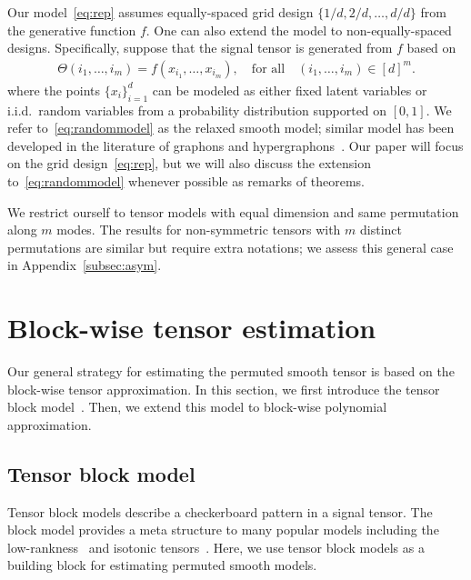 \documentclass[12pt]{article}
\theoremstyle{definition}
\begin{document}
{\color{blue}Our model~\eqref{eq:rep} assumes equally-spaced grid design $\{1/d,2/d,\ldots,d/d\}$ from the generative function $f$. One can also extend the model to non-equally-spaced designs. Specifically, suppose that the signal tensor is generated from $f$ based on 
\begin{align}\label{eq:randommodel}
\Theta(i_1,\ldots,i_m) = f(x_{i_1},\ldots,x_{i_m}), \quad \text{for all} \quad (i_1,\ldots,i_m)\in[d]^m. 
\end{align}
where the points $\{x_i\}_{i=1}^d$ can be modeled as either fixed latent variables or i.i.d.\ random variables from a probability distribution supported on $[0,1]$. We refer to~\eqref{eq:randommodel} as the relaxed smooth model; similar model has been developed in the literature of graphons and hypergraphons~\cite{chan2014consistent,gao2015rate,klopp2017oracle,balasubramanian2021nonparametric}. Our paper will focus on the grid design~\eqref{eq:rep}, but we will also discuss the extension to~\eqref{eq:randommodel} whenever possible as remarks of theorems.}      

We restrict ourself to tensor models with equal dimension and same permutation along $m$ modes. The results for non-symmetric tensors with $m$ distinct permutations are similar but require extra notations; we assess this general case in Appendix~\ref{subsec:asym}. 
    

\section{Block-wise tensor estimation}\label{sec:tba}
Our general strategy for estimating the permuted smooth tensor is based on the block-wise tensor approximation. In this section, we first introduce the tensor block model~\citep{wang2019multiway,han2022exact}. Then, we extend this model to block-wise polynomial approximation.

\subsection{Tensor block model}\label{subsec:bm}
Tensor block models describe a checkerboard pattern in a signal tensor. The block model provides a meta structure to many popular models including the low-rankness~\citep{gao2016optimal} and isotonic tensors~\citep{pananjady2022isotonic}. Here, we use tensor block models as a building block for estimating permuted smooth models. 
\end{document}
